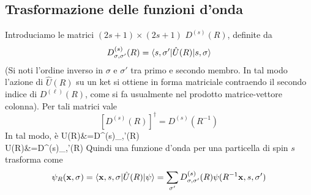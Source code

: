 \documentclass[a4paper, 11pt]{article}
\newcommand{\op}{\hat}
\def\bal#1\eal{\begin{align*}#1\end{align*}}
\newcommand{\1}{\mathbbm{1}}
\renewcommand{\l}{\ell}
\begin{document}
	\subsection{Trasformazione delle funzioni d'onda}
	Introduciamo le matrici $(2s+1)\times(2s+1)$ $D^{(s)}(R)$, definite da
	\[D^{(s)}_{\sigma,\sigma'}(R)=\braketop{s,\sigma'}{\op U(R)}{s,\sigma}\]
	(Si noti l'ordine inverso in $\sigma$ e $\sigma'$ tra primo e secondo membro. In tal modo l'azione di $\op U(R)$ su un ket si ottiene in forma matriciale contraendo il secondo indice di $D^{(\l)}(R)$, come si fa usualmente nel prodotto matrice-vettore colonna). Per tali matrici vale
	\[[D^{(s)}(R)]^\dagger=D^{(s)}(R^{-1})\]
	In tal modo, è
	\bal 
	\op U(R)&=D^{(s)}_{\sigma,\sigma'}(R)	\\\op U(R)&=D^{(s)}_{\sigma,\sigma'}(R)
	\eal
	Quindi una funzione d'onda per una particella di spin $s$ trasforma come
	\[\psi_R(\vec{x},\sigma)=\braketop{\vec{x},s,\sigma}{\op U(R)}{\psi}=\sum_{\sigma'}D^{(s)}_{\sigma,\sigma'}(R)\psi(R^{-1}\vec{x},s,\sigma')\]
\end{document}
